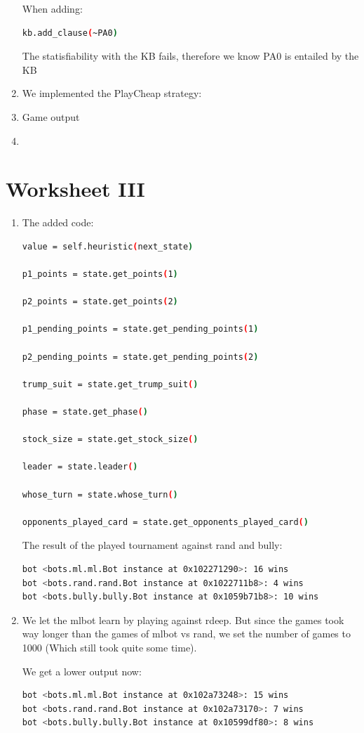 \documentclass[a4paper,11pt]{article}
\begin{document}
\begin{enumerate}
When adding: 
\begin{lstlisting}[language=bash]
kb.add_clause(~PA0)
\end{lstlisting}
The statisfiability with the KB fails, therefore we know PA0 is entailed by the KB

\item We implemented the PlayCheap strategy:

\item Game output

\item 
\end{enumerate}
\section{Worksheet III}
\begin{enumerate}
\item The added code:
\begin{lstlisting}[language=bash]
value = self.heuristic(next_state)

p1_points = state.get_points(1)

p2_points = state.get_points(2)

p1_pending_points = state.get_pending_points(1)

p2_pending_points = state.get_pending_points(2)

trump_suit = state.get_trump_suit()

phase = state.get_phase()

stock_size = state.get_stock_size()

leader = state.leader()

whose_turn = state.whose_turn()

opponents_played_card = state.get_opponents_played_card()
\end{lstlisting}
The result of the played tournament against rand and bully:
\begin{lstlisting}[language=bash]
bot <bots.ml.ml.Bot instance at 0x102271290>: 16 wins
bot <bots.rand.rand.Bot instance at 0x1022711b8>: 4 wins
bot <bots.bully.bully.Bot instance at 0x1059b71b8>: 10 wins
\end{lstlisting}

\item We let the mlbot learn by playing against rdeep. But since the games took way longer than the games of mlbot vs rand, we set the number of games to 1000 (Which still took quite some time).

We get a lower output now:
\begin{lstlisting}[language=bash]
bot <bots.ml.ml.Bot instance at 0x102a73248>: 15 wins
bot <bots.rand.rand.Bot instance at 0x102a73170>: 7 wins
bot <bots.bully.bully.Bot instance at 0x10599df80>: 8 wins
\end{lstlisting}


\end{enumerate}
\end{document}
